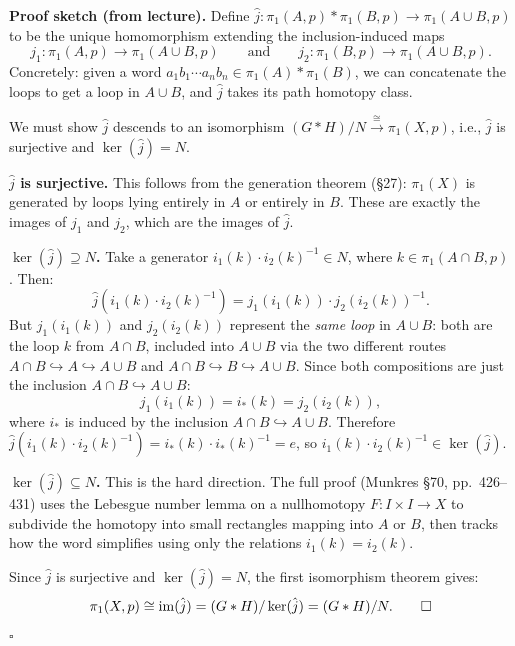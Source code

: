 \documentclass[11pt]{report}
\renewenvironment{proof}[1][Proof]{\noindent\textbf{#1.} }{\hfill$\square$\par\vspace{5pt}}
\begin{document}
\begin{proof}[Proof sketch (from lecture)]
Define $\hat{j}: \pi_1(A, p) * \pi_1(B, p) \to \pi_1(A \cup B, p)$ to be the unique homomorphism extending the inclusion-induced maps
\[j_1: \pi_1(A, p) \to \pi_1(A \cup B, p) \qquad \text{and} \qquad j_2: \pi_1(B, p) \to \pi_1(A \cup B, p).\]
Concretely: given a word $a_1 b_1 \cdots a_n b_n \in \pi_1(A) * \pi_1(B)$, we can concatenate the loops to get a loop in $A \cup B$, and $\hat{j}$ takes its path homotopy class.

We must show $\hat{j}$ descends to an isomorphism $(G * H)/N \xrightarrow{\;\cong\;} \pi_1(X, p)$, i.e., $\hat{j}$ is surjective and $\ker(\hat{j}) = N$.

\textbf{$\hat{j}$ is surjective.} This follows from the generation theorem (\S 27): $\pi_1(X)$ is generated by loops lying entirely in $A$ or entirely in $B$. These are exactly the images of $j_1$ and $j_2$, which are the images of $\hat{j}$.

\textbf{$\ker(\hat{j}) \supseteq N$.} Take a generator $i_1(k) \cdot i_2(k)^{-1} \in N$, where $k \in \pi_1(A \cap B, p)$. Then:
\[\hat{j}(i_1(k) \cdot i_2(k)^{-1}) = j_1(i_1(k)) \cdot j_2(i_2(k))^{-1}.\]
But $j_1(i_1(k))$ and $j_2(i_2(k))$ represent the \emph{same loop} in $A \cup B$: both are the loop $k$ from $A \cap B$, included into $A \cup B$ via the two different routes $A \cap B \hookrightarrow A \hookrightarrow A \cup B$ and $A \cap B \hookrightarrow B \hookrightarrow A \cup B$. Since both compositions are just the inclusion $A \cap B \hookrightarrow A \cup B$:
\[j_1(i_1(k)) = i_*(k) = j_2(i_2(k)),\]
where $i_*$ is induced by the inclusion $A \cap B \hookrightarrow A \cup B$. Therefore $\hat{j}(i_1(k) \cdot i_2(k)^{-1}) = i_*(k) \cdot i_*(k)^{-1} = e$, so $i_1(k) \cdot i_2(k)^{-1} \in \ker(\hat{j})$.

\textbf{$\ker(\hat{j}) \subseteq N$.} This is the hard direction. The full proof (Munkres \S 70, pp.\ 426--431) uses the Lebesgue number lemma on a nullhomotopy $F: I \times I \to X$ to subdivide the homotopy into small rectangles mapping into $A$ or $B$, then tracks how the word simplifies using only the relations $i_1(k) = i_2(k)$.

Since $\hat{j}$ is surjective and $\ker(\hat{j}) = N$, the first isomorphism theorem gives:
\[\pi_1(X, p) \cong \operatorname{im}(\hat{j}) = (G * H) / \ker(\hat{j}) = (G * H) / N. \qedhere\]
\end{proof}
\end{document}
